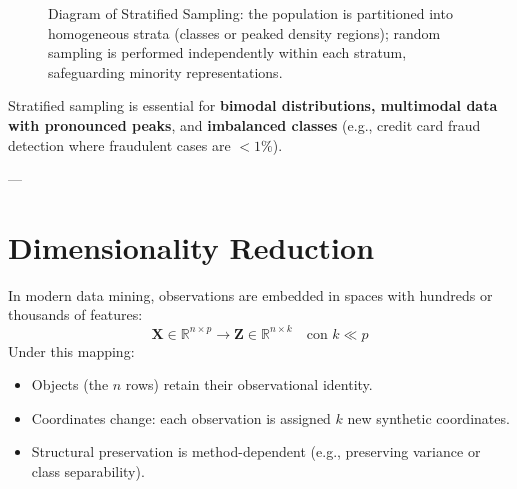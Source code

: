 \begin{figure}[H]
{%
}
\caption{Diagram of Stratified Sampling: the population is partitioned into homogeneous strata (classes or peaked density regions); random sampling is performed independently within each stratum, safeguarding minority representations.}
\label{fig:stratified-sampling-tikz}
\end{figure}

Stratified sampling is essential for \textbf{bimodal distributions, multimodal data with pronounced peaks}, and \textbf{imbalanced classes} (e.g., credit card fraud detection where fraudulent cases are $<1\%$).

---

\section{Dimensionality Reduction}

In modern data mining, observations are embedded in spaces with hundreds or thousands of features:
\begin{equation}
\mathbf{X} \in \mathbb{R}^{n \times p} \longrightarrow \mathbf{Z} \in \mathbb{R}^{n \times k} \quad \text{con } k \ll p
\end{equation}
Under this mapping:
\begin{itemize}
    \item Objects (the $n$ rows) retain their observational identity.
    \item Coordinates change: each observation is assigned $k$ new synthetic coordinates.
    \item Structural preservation is method-dependent (e.g., preserving variance or class separability).
\end{itemize}

